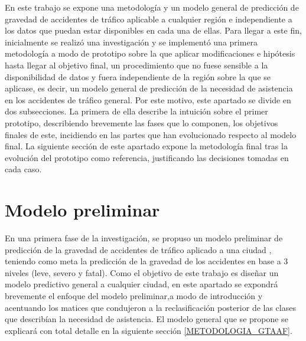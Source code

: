 \documentclass{uathesis-es}
\begin{document}
En este trabajo se expone una metodología y un modelo general de predicción de gravedad de accidentes de tráfico aplicable a cualquier región e independiente a los datos que puedan estar disponibles en cada una de ellas. Para llegar a este fin, inicialmente se realizó una investigación y se implementó una primera metodología a modo de prototipo sobre la que aplicar modificaciones e hipótesis hasta llegar al objetivo final, un procedimiento que no fuese sensible a la disponibilidad de datos y fuera independiente de la región sobre la que se aplicase, es decir, un modelo general de predicción de la necesidad de asistencia en los accidentes de tráfico general. Por este motivo, este apartado se divide en dos subsecciones. La primera de ella describe la intuición sobre el primer prototipo, describiendo brevemente las fases que lo componen, los objetivos finales de este, incidiendo en las partes que han evolucionado respecto al modelo final. La siguiente sección de este apartado expone la metodología final tras la evolución del prototipo como referencia, justificando las decisiones tomadas en cada caso.


\section{Modelo preliminar}
\label{METODOLOGIA_MODELO_PRELIMINAR}



En una primera fase de la investigación, se propuso un modelo preliminar de predicción de la gravedad de accidentes de tráfico aplicado a una ciudad \cite{PEREZSALA2023113245}, teniendo como meta la predicción de la gravedad de los accidentes en base a 3 niveles (leve, severo y fatal). Como el objetivo de este trabajo es diseñar un modelo predictivo general a cualquier ciudad, en este apartado se expondrá brevemente el enfoque del modelo preliminar,a modo de introducción y acentuando los matices que condujeron a la reclasificación posterior de las clases que describían la necesidad de asistencia. El modelo general que se propone se explicará con total detalle en la siguiente sección \ref{METODOLOGIA_GTAAF}.
\end{document}
